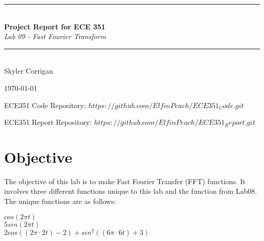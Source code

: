 \documentclass[12pt,a4paper]{article}
\newcommand{\HRule}{\rule{\linewidth}{0.5mm}}
\begin{document}
\begin{titlepage}
\begin{center}



\HRule \\[0.4cm]
{ \LARGE 
  \textbf{Project Report for ECE 351}\\[0.4cm]
  \emph{Lab 09 - Fast Fourier Transform}\\[0.4cm]
}
\HRule \\[1.5cm]



{ \large
  Skyler Corrigan \\[0.1cm]
}

\vfill



{\large \today}

{ \large
ECE351 Code Repository: 
\hyperlink{$https://github.com/ElfinPeach/ECE351_Code.git$}{$https://github.com/ElfinPeach/ECE351_Code.git$}

ECE351 Report Repository: 
\hyperlink{$https://github.com/ElfinPeach/ECE351_Report.git$}{$https://github.com/ElfinPeach/ECE351_Report.git$}
}
 
\end{center}
\end{titlepage}


\newpage

\tableofcontents
{}
\newpage
\setcounter{page}{1}

\section{Objective}
The objective of this lab is to make Fast Fourier Transfer (FFT) functions. It involves three different functions unique to this lab and the function from Lab08. The unique functions are as follows:
\begin{center}
    $cos(2\pi t)$\\
    $5sin(2\pi t)$\\
    $2cos((2\pi \cdot 2t)-2) + sin^2 ((6\pi \cdot 6t) + 3)$
\end{center}
\end{document}
